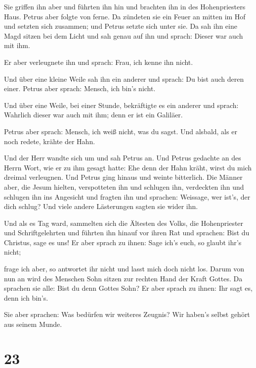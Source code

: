  Sie griffen ihn aber und führten ihn hin und brachten
ihn in des Hohenpriesters Haus. Petrus aber folgte von ferne.
 Da zündeten sie ein Feuer an mitten im Hof und setzten
sich zusammen; und Petrus setzte sich unter sie.  Da sah
ihn eine Magd sitzen bei dem Licht und sah genau auf ihn und sprach:
Dieser war auch mit ihm.

 Er aber verleugnete ihn und sprach: Frau, ich kenne ihn
nicht.

 Und über eine kleine Weile sah ihn ein anderer und
sprach: Du bist auch deren einer. Petrus aber sprach: Mensch, ich bin's
nicht.

 Und über eine Weile, bei einer Stunde, bekräftigte es
ein anderer und sprach: Wahrlich dieser war auch mit ihm; denn er ist
ein Galiläer.

 Petrus aber sprach: Mensch, ich weiß nicht, was du
sagst. Und alsbald, als er noch redete, krähte der Hahn.

 Und der Herr wandte sich um und sah Petrus an. Und
Petrus gedachte an des Herrn Wort, wie er zu ihm gesagt hatte: Ehe denn
der Hahn kräht, wirst du mich dreimal verleugnen.  Und
Petrus ging hinaus und weinte bitterlich.  Die Männer
aber, die Jesum hielten, verspotteten ihn und schlugen ihn,
 verdeckten ihn und schlugen ihn ins Angesicht und
fragten ihn und sprachen: Weissage, wer ist's, der dich schlug?
 Und viele andere Lästerungen sagten sie wider ihn.

 Und als es Tag ward, sammelten sich die Ältesten des
Volks, die Hohenpriester und Schriftgelehrten und führten ihn hinauf vor
ihren Rat  und sprachen: Bist du Christus, sage es uns!
Er aber sprach zu ihnen: Sage ich's euch, so glaubt ihr's nicht;

 frage ich aber, so antwortet ihr nicht und lasst mich
doch nicht los.  Darum von nun an wird des Menschen Sohn
sitzen zur rechten Hand der Kraft Gottes.  Da sprachen
sie alle: Bist du denn Gottes Sohn? Er aber sprach zu ihnen: Ihr sagt
es, denn ich bin's.

 Sie aber sprachen: Was bedürfen wir weiteres Zeugnis?
Wir haben's selbst gehört aus seinem Munde.

\hypertarget{section-22}{%
\section{23}\label{section-22}}

